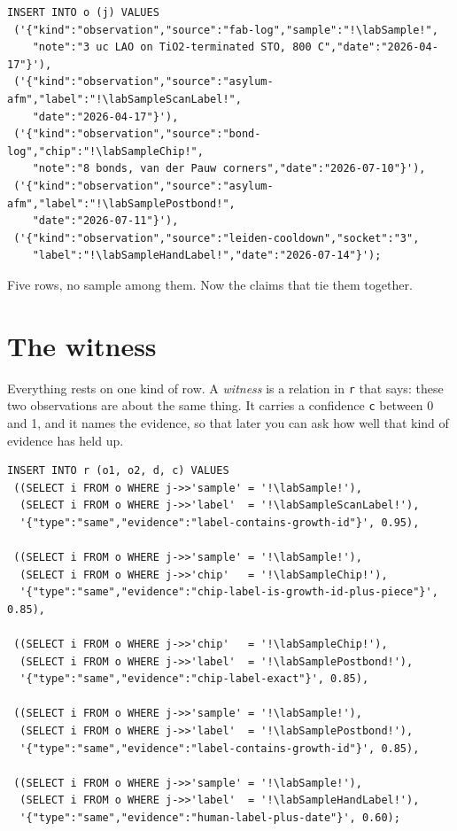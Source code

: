 \begin{lstlisting}
INSERT INTO o (j) VALUES
 ('{"kind":"observation","source":"fab-log","sample":"!\labSample!",
    "note":"3 uc LAO on TiO2-terminated STO, 800 C","date":"2026-04-17"}'),
 ('{"kind":"observation","source":"asylum-afm","label":"!\labSampleScanLabel!",
    "date":"2026-04-17"}'),
 ('{"kind":"observation","source":"bond-log","chip":"!\labSampleChip!",
    "note":"8 bonds, van der Pauw corners","date":"2026-07-10"}'),
 ('{"kind":"observation","source":"asylum-afm","label":"!\labSamplePostbond!",
    "date":"2026-07-11"}'),
 ('{"kind":"observation","source":"leiden-cooldown","socket":"3",
    "label":"!\labSampleHandLabel!","date":"2026-07-14"}');
\end{lstlisting}

Five rows, no sample among them. Now the claims that tie them together.

\section{The witness}

Everything rests on one kind of row. A \emph{witness} is a relation in \texttt{r} that says: these two observations are about the same thing. It carries a confidence \texttt{c} between 0 and 1, and it names the evidence, so that later you can ask how well that kind of evidence has held up.

\begin{lstlisting}
INSERT INTO r (o1, o2, d, c) VALUES
 ((SELECT i FROM o WHERE j->>'sample' = '!\labSample!'),
  (SELECT i FROM o WHERE j->>'label'  = '!\labSampleScanLabel!'),
  '{"type":"same","evidence":"label-contains-growth-id"}', 0.95),

 ((SELECT i FROM o WHERE j->>'sample' = '!\labSample!'),
  (SELECT i FROM o WHERE j->>'chip'   = '!\labSampleChip!'),
  '{"type":"same","evidence":"chip-label-is-growth-id-plus-piece"}', 0.85),

 ((SELECT i FROM o WHERE j->>'chip'   = '!\labSampleChip!'),
  (SELECT i FROM o WHERE j->>'label'  = '!\labSamplePostbond!'),
  '{"type":"same","evidence":"chip-label-exact"}', 0.85),

 ((SELECT i FROM o WHERE j->>'sample' = '!\labSample!'),
  (SELECT i FROM o WHERE j->>'label'  = '!\labSamplePostbond!'),
  '{"type":"same","evidence":"label-contains-growth-id"}', 0.85),

 ((SELECT i FROM o WHERE j->>'sample' = '!\labSample!'),
  (SELECT i FROM o WHERE j->>'label'  = '!\labSampleHandLabel!'),
  '{"type":"same","evidence":"human-label-plus-date"}', 0.60);
\end{lstlisting}

